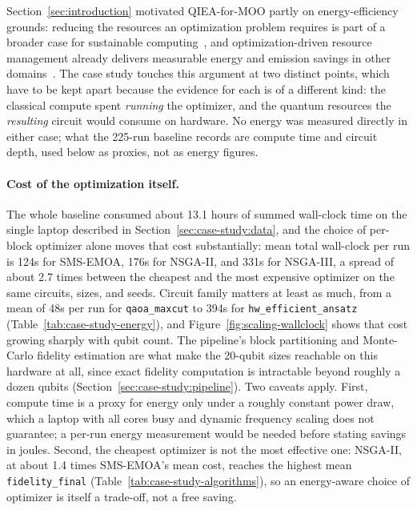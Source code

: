 Section~\ref{sec:introduction} motivated QIEA-for-MOO partly on
energy-efficiency grounds: reducing the resources an optimization
problem requires is part of a broader case for sustainable
computing~\citep{sai2026generative,banciu2026aiot}, and
optimization-driven resource management already delivers measurable
energy and emission savings in other domains~\citep{moga2025rlmicrogrid}.
The case study touches this argument at two distinct points, which
have to be kept apart because the evidence for each is of a different
kind: the classical compute spent \emph{running} the optimizer, and the
quantum resources the \emph{resulting} circuit would consume on
hardware. No energy was measured directly in either case; what the
225-run baseline records are compute time and circuit depth, used below
as proxies, not as energy figures.

\paragraph{Cost of the optimization itself.}
The whole baseline consumed about 13.1 hours of summed wall-clock time
on the single laptop described in Section~\ref{sec:case-study:data},
and the choice of per-block optimizer alone moves that cost
substantially: mean total wall-clock per run is 124s for SMS-EMOA,
176s for NSGA-II, and 331s for NSGA-III, a spread of about 2.7 times
between the cheapest and the most expensive optimizer on the same
circuits, sizes, and seeds. Circuit family matters at least as much,
from a mean of 48s per run for \texttt{qaoa\_maxcut} to 394s for
\texttt{hw\_efficient\_ansatz} (Table~\ref{tab:case-study-energy}),
and Figure~\ref{fig:scaling-wallclock} shows that cost growing sharply
with qubit count. The pipeline's block partitioning and Monte-Carlo
fidelity estimation are what make the 20-qubit sizes reachable on this
hardware at all, since exact fidelity computation is intractable beyond
roughly a dozen qubits (Section~\ref{sec:case-study:pipeline}). Two
caveats apply. First, compute time is a proxy for energy only under a
roughly constant power draw, which a laptop with all cores busy and
dynamic frequency scaling does not guarantee; a per-run energy
measurement would be needed before stating savings in joules. Second,
the cheapest optimizer is not the most effective one: NSGA-II, at
about 1.4 times SMS-EMOA's mean cost, reaches the highest mean
\texttt{fidelity\_final} (Table~\ref{tab:case-study-algorithms}), so an
energy-aware choice of optimizer is itself a trade-off, not a free
saving.


